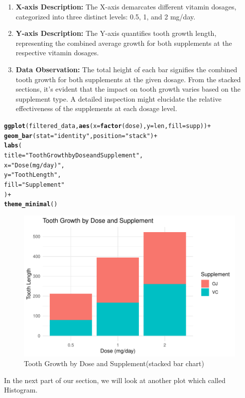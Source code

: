 \documentclass{article}\usepackage[]{graphicx}\usepackage[]{xcolor}
\makeatletter
\def\maxwidth{ %
  \ifdim\Gin@nat@width>\linewidth
    \linewidth
  \else
    \Gin@nat@width
  \fi
}
\newcommand{\hlstr}[1]{\textcolor[rgb]{0.192,0.494,0.8}{#1}}%
\newcommand{\hlopt}[1]{\textcolor[rgb]{0,0,0}{#1}}%
\newcommand{\hlstd}[1]{\textcolor[rgb]{0.345,0.345,0.345}{#1}}%
\newcommand{\hlkwc}[1]{\textcolor[rgb]{0.333,0.667,0.333}{#1}}%
\newcommand{\hlkwd}[1]{\textcolor[rgb]{0.737,0.353,0.396}{\textbf{#1}}}%
\newenvironment{kframe}{%
 \def\at@end@of@kframe{}%
 \ifinner\ifhmode%
  \def\at@end@of@kframe{\end{minipage}}%
  \begin{minipage}{\columnwidth}%
 \fi\fi%
 \def\FrameCommand##1{\hskip\@totalleftmargin \hskip-\fboxsep
 \colorbox{shadecolor}{##1}\hskip-\fboxsep
     \hskip-\linewidth \hskip-\@totalleftmargin \hskip\columnwidth}%
 \MakeFramed {\advance\hsize-\width
   \@totalleftmargin\z@ \linewidth\hsize
   \@setminipage}}%
 {\par\unskip\endMakeFramed%
 \at@end@of@kframe}
\newenvironment{knitrout}{}{} %
\makeatother
\begin{document}
\begin{enumerate}
    \item \textbf{X-axis Description:} The X-axis demarcates different vitamin dosages, categorized into three distinct levels: 0.5, 1, and 2 mg/day.
    
    \item \textbf{Y-axis Description:} The Y-axis quantifies tooth growth length, representing the combined average growth for both supplements at the respective vitamin dosages.
    \item \textbf{Data Observation:} The total height of each bar signifies the combined tooth growth for both supplements at the given dosage. From the stacked sections, it's evident that the impact on tooth growth varies based on the supplement type. A detailed inspection might elucidate the relative effectiveness of the supplements at each dosage level.
\end{enumerate}
\begin{knitrout}
\color{fgcolor}\begin{kframe}
\begin{alltt}
\hlkwd{ggplot}\hlstd{(filtered_data,} \hlkwd{aes}\hlstd{(}\hlkwc{x} \hlstd{=} \hlkwd{factor}\hlstd{(dose),} \hlkwc{y} \hlstd{= len,} \hlkwc{fill} \hlstd{= supp))} \hlopt{+}
  \hlkwd{geom_bar}\hlstd{(}\hlkwc{stat} \hlstd{=} \hlstr{"identity"}\hlstd{,} \hlkwc{position} \hlstd{=} \hlstr{"stack"}\hlstd{)} \hlopt{+}
  \hlkwd{labs}\hlstd{(}
    \hlkwc{title} \hlstd{=} \hlstr{"Tooth Growth by Dose and Supplement"}\hlstd{,}
    \hlkwc{x} \hlstd{=} \hlstr{"Dose (mg/day)"}\hlstd{,}
    \hlkwc{y} \hlstd{=} \hlstr{"Tooth Length"}\hlstd{,}
    \hlkwc{fill} \hlstd{=} \hlstr{"Supplement"}
  \hlstd{)} \hlopt{+}
  \hlkwd{theme_minimal}\hlstd{()}
\end{alltt}
\end{kframe}\begin{figure}
\includegraphics[width=\maxwidth]{figure/bar_chat3-1} \caption[Tooth Growth by Dose and Supplement(stacked bar chart)]{Tooth Growth by Dose and Supplement(stacked bar chart)}\label{fig:bar chat3}
\end{figure}

\end{knitrout}
In the next part of our section, we will look at another plot which called Histogram.
\end{document}
